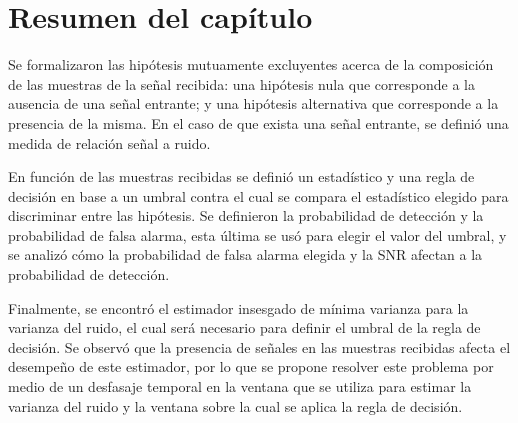 \color{black}

\section{Resumen del capítulo}

Se formalizaron las hipótesis mutuamente excluyentes acerca de la composición de las muestras de la señal recibida: una hipótesis nula que corresponde a la ausencia de una señal entrante; y una hipótesis alternativa que corresponde a la presencia de la misma. En el caso de que exista una señal entrante, se definió una medida de relación señal a ruido.  

En función de las muestras recibidas se definió un estadístico y una regla de decisión en base a un umbral contra el cual se compara el estadístico elegido para discriminar entre las hipótesis. Se definieron la probabilidad de detección y la probabilidad de falsa alarma, esta última se usó para elegir el valor del umbral, y se analizó cómo la probabilidad de falsa alarma elegida y la SNR afectan a la probabilidad de detección. 

Finalmente, se encontró el estimador insesgado de mínima varianza para la varianza del ruido, el cual será necesario para definir el umbral de la regla de decisión. Se observó que la presencia de señales en las muestras recibidas afecta el desempeño de este estimador, por lo que se propone resolver este problema por medio de un desfasaje temporal en la ventana que se utiliza para estimar la varianza del ruido y la ventana sobre la cual se aplica la regla de decisión.
